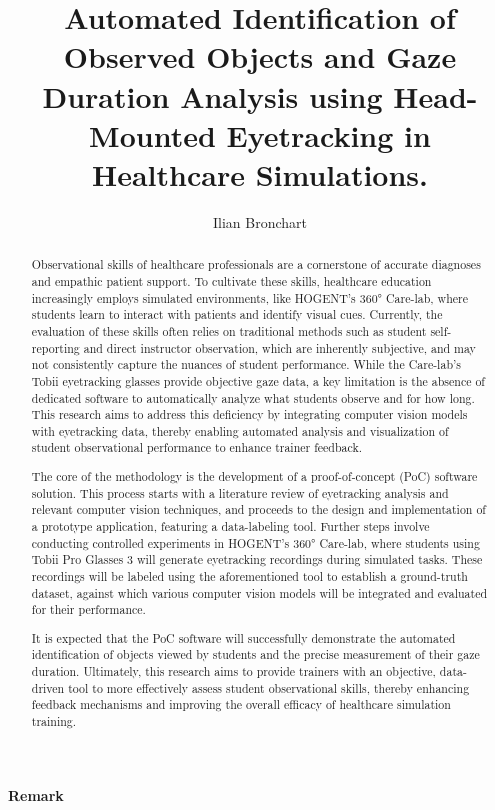 \documentclass[english]{hogent-article}
\title{Automated Identification of Observed Objects and Gaze Duration Analysis using Head-Mounted Eyetracking in Healthcare Simulations.}
\author{Ilian Bronchart}
\begin{document}
\begin{abstract}
Observational skills of healthcare professionals are a cornerstone of accurate diagnoses and empathic patient support. 
To cultivate these skills, healthcare education increasingly employs simulated environments, 
like HOGENT's 360° Care-lab, where students learn to interact with patients and identify visual cues. 
Currently, the evaluation of these skills often relies on traditional methods such as student 
self-reporting and direct instructor observation, which are inherently subjective, and may not 
consistently capture the nuances of student performance. 
While the Care-lab's Tobii eyetracking glasses provide objective gaze data, a key limitation is the absence 
of dedicated software to automatically analyze what students observe and for how long.
This research aims to address this deficiency by integrating computer vision models with eyetracking data, 
thereby enabling automated analysis and visualization of student observational performance to enhance trainer feedback.

The core of the methodology is the development of a proof-of-concept (PoC) software solution. 
This process starts with a literature review of eyetracking analysis and relevant computer vision techniques, 
and proceeds to the design and implementation of a prototype application, featuring a data-labeling tool. 
Further steps involve conducting controlled experiments in HOGENT's 360° Care-lab, 
where students using Tobii Pro Glasses 3 will generate eyetracking recordings during simulated tasks. 
These recordings will be labeled using the aforementioned tool to establish a ground-truth dataset, 
against which various computer vision models will be integrated and evaluated for their 
performance.

It is expected that the PoC software will successfully demonstrate the automated identification 
of objects viewed by students and the precise measurement of their gaze duration. 
Ultimately, this research aims to provide trainers with an objective, data-driven tool to more effectively assess 
student observational skills, thereby enhancing feedback mechanisms and improving the overall efficacy of healthcare simulation training.
\end{abstract}

\tableofcontents

\bigskip

\paragraph{Remark}
\end{document}
